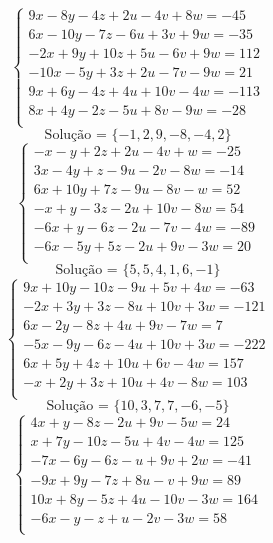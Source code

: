 \documentclass[12pt,oneside,a4paper]{article}
\begin{document}
\vspace{\baselineskip}
\begin{equation*}
\begin{cases}
9x-8y-4z+2u-4v+8w=-45 \\
6x-10y-7z-6u+3v+9w=-35 \\
-2x+9y+10z+5u-6v+9w=112 \\
-10x-5y+3z+2u-7v-9w=21 \\
9x+6y-4z+4u+10v-4w=-113 \\
8x+4y-2z-5u+8v-9w=-28 \\
\end{cases}
\end{equation*}
\begin{equation*}
\text{Solução = }\{-1,2,9,-8,-4,2\}
\end{equation*}
\vspace{\baselineskip}
\begin{equation*}
\begin{cases}
-x-y+2z+2u-4v+w=-25 \\
3x-4y+z-9u-2v-8w=-14 \\
6x+10y+7z-9u-8v-w=52 \\
-x+y-3z-2u+10v-8w=54 \\
-6x+y-6z-2u-7v-4w=-89 \\
-6x-5y+5z-2u+9v-3w=20 \\
\end{cases}
\end{equation*}
\begin{equation*}
\text{Solução = }\{5,5,4,1,6,-1\}
\end{equation*}
\vspace{\baselineskip}
\begin{equation*}
\begin{cases}
9x+10y-10z-9u+5v+4w=-63 \\
-2x+3y+3z-8u+10v+3w=-121 \\
6x-2y-8z+4u+9v-7w=7 \\
-5x-9y-6z-4u+10v+3w=-222 \\
6x+5y+4z+10u+6v-4w=157 \\
-x+2y+3z+10u+4v-8w=103 \\
\end{cases}
\end{equation*}
\begin{equation*}
\text{Solução = }\{10,3,7,7,-6,-5\}
\end{equation*}
\vspace{\baselineskip}
\begin{equation*}
\begin{cases}
4x+y-8z-2u+9v-5w=24 \\
x+7y-10z-5u+4v-4w=125 \\
-7x-6y-6z-u+9v+2w=-41 \\
-9x+9y-7z+8u-v+9w=89 \\
10x+8y-5z+4u-10v-3w=164 \\
-6x-y-z+u-2v-3w=58 \\
\end{cases}
\end{equation*}
\end{document}
